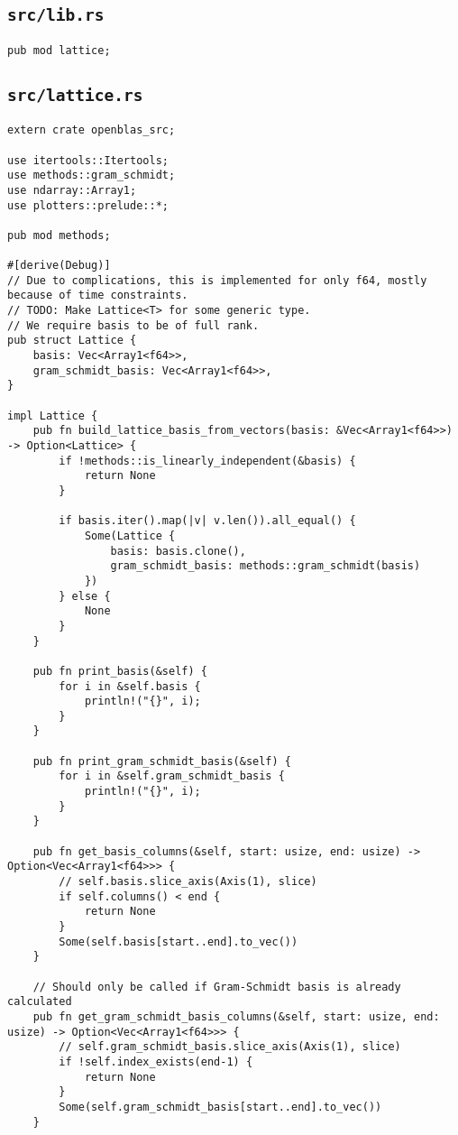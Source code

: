 \subsection{\texttt{src/lib.rs}}
\begin{verbatim}
pub mod lattice;
\end{verbatim}

\subsection{\texttt{src/lattice.rs}}

\begin{verbatim}
extern crate openblas_src;

use itertools::Itertools;
use methods::gram_schmidt;
use ndarray::Array1;
use plotters::prelude::*;

pub mod methods;

#[derive(Debug)]
// Due to complications, this is implemented for only f64, mostly because of time constraints.
// TODO: Make Lattice<T> for some generic type.
// We require basis to be of full rank.
pub struct Lattice {
    basis: Vec<Array1<f64>>,
    gram_schmidt_basis: Vec<Array1<f64>>,
}

impl Lattice {
    pub fn build_lattice_basis_from_vectors(basis: &Vec<Array1<f64>>) -> Option<Lattice> {
        if !methods::is_linearly_independent(&basis) {
            return None
        }
                
        if basis.iter().map(|v| v.len()).all_equal() {
            Some(Lattice {
                basis: basis.clone(),
                gram_schmidt_basis: methods::gram_schmidt(basis)
            })
        } else {
            None
        }
    }

    pub fn print_basis(&self) {
        for i in &self.basis {
            println!("{}", i);
        }
    }

    pub fn print_gram_schmidt_basis(&self) {
        for i in &self.gram_schmidt_basis {
            println!("{}", i);
        }
    }

    pub fn get_basis_columns(&self, start: usize, end: usize) -> Option<Vec<Array1<f64>>> {
        // self.basis.slice_axis(Axis(1), slice)
        if self.columns() < end {
            return None
        }
        Some(self.basis[start..end].to_vec())
    }

    // Should only be called if Gram-Schmidt basis is already calculated
    pub fn get_gram_schmidt_basis_columns(&self, start: usize, end: usize) -> Option<Vec<Array1<f64>>> {
        // self.gram_schmidt_basis.slice_axis(Axis(1), slice)
        if !self.index_exists(end-1) {
            return None
        }
        Some(self.gram_schmidt_basis[start..end].to_vec())
    }


\end{verbatim}
